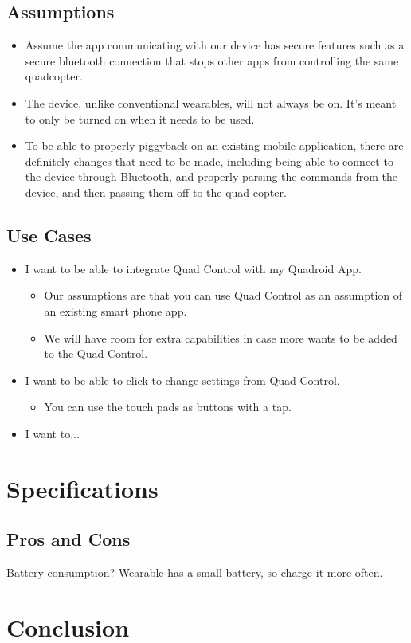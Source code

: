 \documentclass[12pt,letterpaper]{article}
\begin{document}
\subsection*{Assumptions}
\begin{itemize}
\item Assume the app communicating with our device has secure features such as a secure bluetooth connection that stops other apps from controlling the same quadcopter. 
\item The device, unlike conventional wearables, will not always be on. It’s meant to only be turned on when it needs to be used. 
\item To be able to properly piggyback on an existing  mobile application, there are definitely changes that need to be made, including being able to connect to the device through Bluetooth, and properly parsing the commands from the device, and then passing them off to the quad copter.
\end{itemize}

\subsection*{Use Cases}
\begin{itemize}
\item I want to be able to integrate Quad Control with my Quadroid App.
\begin{itemize}
\item Our assumptions are that you can use Quad Control as an assumption of an existing smart phone app.
\item We will have room for extra capabilities in case more wants to be added to the Quad Control.
\end{itemize}
\item I want to be able to click to change settings from Quad Control.
\begin{itemize}
\item You can use the touch pads as buttons with a tap.
\end{itemize}
\item I want to...
\end{itemize}



\section*{Specifications}
\subsection*{Pros and Cons}
Battery consumption?
Wearable has a small battery, so charge it more often.


\section*{Conclusion}

\newpage
\nocite{*}


\end{document}
